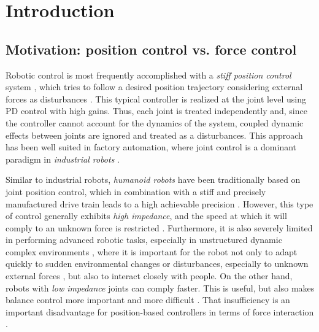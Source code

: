 \section{Introduction}
	\label{sec:introduction}

	\subsection{Motivation: position control vs. force control}
		\label{sub:motivation}
		
		Robotic control is most frequently accomplished with a \emph{stiff position control} system
		\cite{Khatib_ICRA2008}, which tries to follow a desired position trajectory considering external
		forces as disturbances \cite{DelPrete_PhDThesis2013}.
		This typical controller is realized at the joint level using PD control with high gains.
		Thus, each joint is treated	independently	and, since the controller cannot account for the dynamics
		of the system, coupled dynamic effects between joints are ignored and treated as a disturbances.
		This approach has been well suited in factory automation, where joint control is a dominant
		paradigm in \emph{industrial robots} \cite{Khatib_ICRA2008}.
		
		Similar to industrial robots, \emph{humanoid robots} have been traditionally based on joint
		position control, which in combination with a stiff and precisely manufactured drive train
		leads to a high achievable precision \cite{Englsberger_Humanoids2015}.
		However, this type of control generally exhibits \emph{high impedance}, and the speed at which
		it will comply to an unknown force is restricted \cite{Stephens_IROS2010}.
		Furthermore, it is also severely limited in performing advanced robotic tasks, especially in
		unstructured dynamic complex environments \cite{Khatib_ICRA2008}, where it is important for the
		robot not only to adapt	quickly to sudden environmental changes or disturbances, especially to
		unknown external forces	\cite{Hyon_TransRobotics2007}, but also to interact closely with people.
		On the other hand, robots with \emph{low impedance} joints can comply faster.
		This is useful, but also makes balance control more important and more difficult \cite{Stephens_IROS2010}.
		That insufficiency is an important disadvantage for position-based controllers
		in terms of force	interaction \cite{Hyon_TransRobotics2007}.
		

